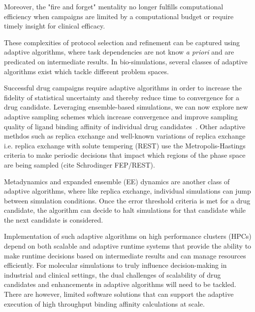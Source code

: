 Moreover, the "fire and forget" mentality no longer fulfills computational 
efficiency when campaigns are limited by a computational budget or require 
timely insight for clinical efficacy. 

These complexities of protocol selection and refinement can be captured using 
adaptive algorithms, where task dependencies are not know 
\textit{a priori} and are predicated on intermediate results. In bio-simulations, 
several classes of adaptive algorithms exist which tackle different problem spaces. 

Successful drug campaigns require adaptive algorithms in order to increase 
the fidelity of statistical uncertainty and thereby reduce time to convergence 
for a drug candidate. Leveraging ensemble-based simulations, we can now explore 
new adaptive sampling schemes which increase convergence and improve 
sampling quality of ligand binding affinity of individual drug 
candidates~\cite{DeFabritiis2014}. Other adaptive methdos such as replica 
exchange and well-known variations of replica exchange i.e. replica exchange 
with solute tempering (REST) use the Metropolis-Hastings criteria to make 
periodic decisions that impact which regions of the phase space are being 
sampled (cite Schrodinger FEP/REST).

Metadynamics and expanded ensemble (EE) dynamics are another class of 
adaptive algorithms, where like replica exchange, individual simulations 
can jump between simulation conditions. Once the error threshold 
criteria is met for a drug candidate, the algorithm can decide to halt 
simulations for that candidate while the next candidate is considered. 






Implementation of such adaptive algorithms on high performance clusters (HPCs) 
depend on both scalable and adaptive runtime systems that provide the 
ability to make runtime decisions based on intermediate results and can manage 
resources efficiently. For molecular simulations to truly influence 
decision-making in industrial and clinical settings, the dual challenges of 
scalability of drug candidates and enhancements in adaptive algorithms will 
need to be tackled. There are however, limited software solutions that can 
support the adaptive execution of high throughput binding affinity calculations 
at scale.

